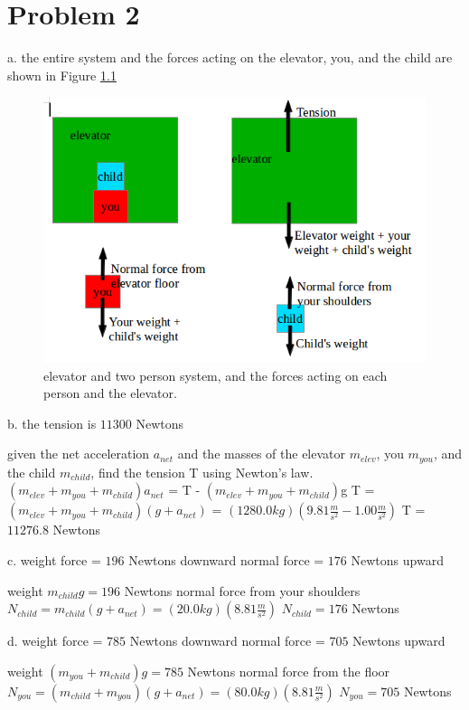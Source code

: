 \chapter{Problem 2}
\label{Problem 2}
a. the entire system and the forces acting on the elevator, you, and the child are shown
in Figure \ref{fig:partA}

\begin{figure}[h]
	\centering
	\includegraphics[scale=0.85]{figures/exam2problem2partA_image.png}
	\caption{elevator and two person system, and the forces acting on each person and the elevator.}
	\label{fig:partA}
\end{figure}

b. the tension is $11300$ Newtons
                                              
given the net acceleration $a_{net}$ and the masses of the elevator $m_{elev}$, you $m_{you}$, and
the child $m_{child}$, find the tension T using Newton's law.
$(m_{elev} + m_{you} + m_{child})a_{net}$ = T - $(m_{elev} + m_{you} + m_{child})$g
T = $(m_{elev} + m_{you} + m_{child})(g + a_{net})$ = $(1280.0 kg)(9.81 \frac{m}{s^{2}} - 1.00 \frac{m}{s^{2}})$
T = $11276.8$ Newtons

c. weight force = $196$ Newtons downward   normal force = $176$ Newtons upward
                                                     
weight $m_{child}g = 196$ Newtons
normal force from your shoulders $N_{child} = m_{child}(g + a_{net}) = (20.0 kg)(8.81 \frac{m}{s^{2}})$
$N_{child} = 176$ Newtons

d. weight force = $785$ Newtons downward   normal force = $705$ Newtons upward
                                                           
weight $(m_{you} + m_{child})g = 785$ Newtons
normal force from the floor $N_{you} = (m_{child} + m_{you})(g + a_{net}) = (80.0 kg)(8.81 \frac{m}{s^{2}})$
$N_{you} = 705$ Newtons


